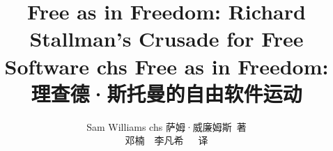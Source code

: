 \documentclass[UTF8, a5paper, 10pt]{book}
\def\chs{chs}
\begin{document}
\title{\ifdefined\eng
Free as in Freedom: Richard Stallman's Crusade for Free Software
\fi
\ifdefined\chs
Free as in Freedom: \\ 理查德·斯托曼的自由软件运动
\fi
}
\author{\ifdefined\eng
Sam Williams
\fi
\ifdefined\chs
萨姆·威廉姆斯\ 著\\
\bigskip
邓楠\ \ 李凡希\ \ \ 译
\fi}
\date{}

\maketitle
\thispagestyle{empty}
\frontmatter
\thispagestyle{empty}
\renewcommand\contentsname{\textbf{目录}} 
\tableofcontents


\mainmatter














\backmatter



\printindex
\end{document}
